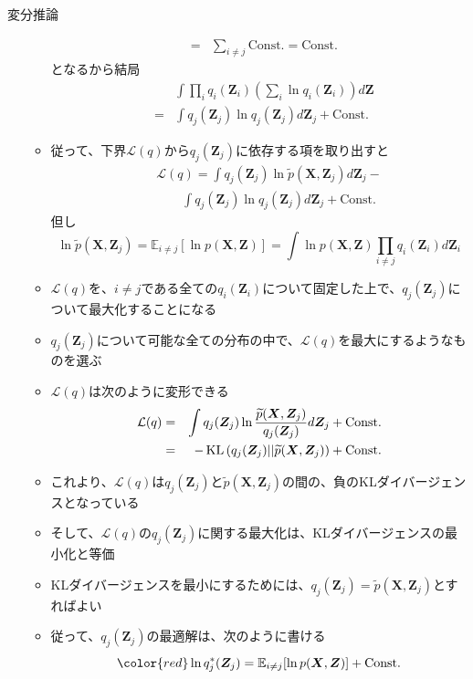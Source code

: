 \documentclass[dvipdfmx,notheorems,t]{beamer}
\begin{document}
\begin{frame}{変分推論}
\begin{itemize}
\begin{itemize}
\begin{eqnarray}
			&=& \sum_{i \neq j} \mathrm{Const.} = \mathrm{Const.}
		\end{eqnarray}
		となるから結局
		\begin{eqnarray}
			&& \int \prod_i q_i(\bm{Z}_i) \left( \sum_i \ln q_i(\bm{Z}_i) \right) d\bm{Z} \nonumber \\
			&=& \int q_j(\bm{Z}_j) \ln q_j(\bm{Z}_j) d\bm{Z}_j + \mathrm{Const.}
		\end{eqnarray}
		
		\item 従って、下界$\mathcal{L}(q)$から$q_j(\bm{Z}_j)$に依存する項を取り出すと
		\begin{eqnarray}
			&& \mathcal{L}(q) = \int q_j(\bm{Z}_j) \ln \widetilde{p}(\bm{X}, \bm{Z}_j) d\bm{Z}_j - \nonumber \\
			&& \qquad \int q_j(\bm{Z}_j) \ln q_j(\bm{Z}_j) d\bm{Z}_j + \mathrm{Const.}
		\end{eqnarray}
		但し
		\begin{equation}
			\ln \widetilde{p}(\bm{X}, \bm{Z}_j) = \mathbb{E}_{i \neq j}[\ln p(\bm{X}, \bm{Z})] = \int \ln p(\bm{X}, \bm{Z}) \prod_{i \neq j} q_i(\bm{Z}_i) d\bm{Z}_i
		\end{equation}
		
		\item $\mathcal{L}(q)$を、$i \neq j$である全ての$q_i(\bm{Z}_i)$について\alert{固定}した上で、$q_j(\bm{Z}_j)$について最大化することになる
		\item $q_j(\bm{Z}_j)$について可能な全ての分布の中で、$\mathcal{L}(q)$を最大にするようなものを選ぶ
		
		\item $\mathcal{L}(q)$は次のように変形できる
		\begin{eqnarray}
			\mathcal{L}(q) &=& \int q_j(\bm{Z}_j) \ln \frac{\widetilde{p}(\bm{X}, \bm{Z}_j)}{q_j(\bm{Z}_j)} d\bm{Z}_j + \mathrm{Const.} \\
			&=& - \operatorname{KL} \left( q_j(\bm{Z}_j) || \widetilde{p}(\bm{X}, \bm{Z}_j) \right) + \mathrm{Const.}
		\end{eqnarray}
		
		\item これより、$\mathcal{L}(q)$は$q_j(\bm{Z}_j)$と$\widetilde{p}(\bm{X}, \bm{Z}_j)$の間の、負のKLダイバージェンスとなっている
		\item そして、$\mathcal{L}(q)$の$q_j(\bm{Z}_j)$に関する最大化は、\alert{KLダイバージェンスの最小化}と等価
		\newline
		\item KLダイバージェンスを最小にするためには、$q_j(\bm{Z}_j) = \widetilde{p}(\bm{X}, \bm{Z}_j)$とすればよい
		\newline
		\item 従って、$q_j(\bm{Z}_j)$の最適解は、次のように書ける
		\begin{equation}
			\color{red}\ln q_j^*(\bm{Z}_j) = \mathbb{E}_{i \neq j}[\ln p(\bm{X}, \bm{Z})] + \mathrm{Const.}\normalcolor
		\end{equation}
	\end{itemize}
\end{itemize}

\end{frame}
\end{document}
